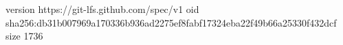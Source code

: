 version https://git-lfs.github.com/spec/v1
oid sha256:db31b007969a170336b936ad2275ef8fabf17324eba22f49b66a25330f432dcf
size 1736
